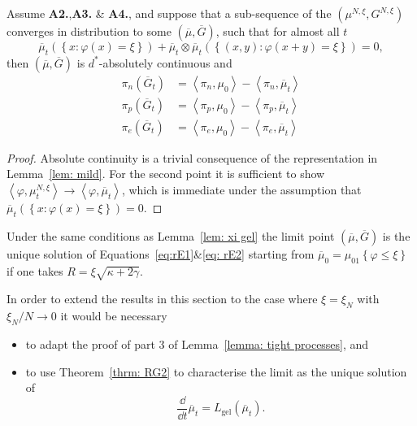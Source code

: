\begin{lemma}\label{lem: xi gel}
Assume \textbf{A2.},\textbf{A3.} \& \textbf{A4.}, and suppose that a sub-sequence of the $\left(\mu^{N,\xi}, G^{N,\xi}\right)$ converges in distribution to some $\left(\overline{\mu}, \overline{G}\right)$, such that for almost all $t$
\begin{equation*}
  \overline{\mu}_t\left(\left\{x\colon \varphi(x) = \xi\right\}\right) + 
  \overline{\mu}_t \otimes \overline{\mu}_t \left(\left\{(x,y) \colon \varphi(x+y) = \xi\right\}\right) = 0,
\end{equation*}
then  $\left(\overline{\mu}, \overline{G}\right)$ is $d^\ast$-absolutely continuous and
  \begin{align*}
      \pi_n\left(\overline{G}_t\right) &= \left<\pi_n, \mu_0\right> - \left<\pi_n, \overline{\mu}_t\right>\\
      \pi_p\left(\overline{G}_t\right) &= \left<\pi_p, \mu_0\right> - \left<\pi_p, \overline{\mu}_t\right>\\
      \pi_e\left(\overline{G}_t\right) &= \left<\pi_e, \mu_0\right> - \left<\pi_e, \overline{\mu}_t\right>
  \end{align*}
\end{lemma}
\begin{proof}
Absolute continuity is a trivial consequence of the representation in Lemma~\ref{lem: mild}.
For the second point it is sufficient to show $\left<\varphi, \mu^{N,\xi}_t\right> \rightarrow \left<\varphi, \overline{\mu}_t\right>$, which is immediate under the assumption that $\overline{\mu}_t\left(\left\{x\colon \varphi(x) = \xi\right\}\right)= 0$. 
\end{proof}

\begin{lemma}\label{lem: sseq converg}
Under the same conditions as Lemma~\ref{lem: xi gel} the limit point $\left(\overline{\mu}, \overline{G}\right)$ is the unique solution of Equations~\ref{eq:rE1}\&\ref{eq: rE2} starting from $\overline{\mu}_0 = \mu_01\left\{\varphi \leq \xi\right\}$ if one takes $R = \xi \sqrt{\kappa + 2\gamma}$.
\end{lemma}

\begin{remark}
In order to extend the results in this section to the case where $\xi = \xi_N$ with $\xi_N / N \rightarrow 0$ it would be necessary 
\begin{itemize}
    \item to adapt the proof of part 3 of Lemma~\ref{lemma: tight processes}, and
    \item to use Theorem~\ref{thrm: RG2} to characterise the limit as the unique solution of 
\begin{equation*}
    \frac{\dd}{\dd t} \overline{\mu}_t = L_\mathrm{gel}(\overline{\mu}_t).
\end{equation*}
\end{itemize}
\end{remark}
